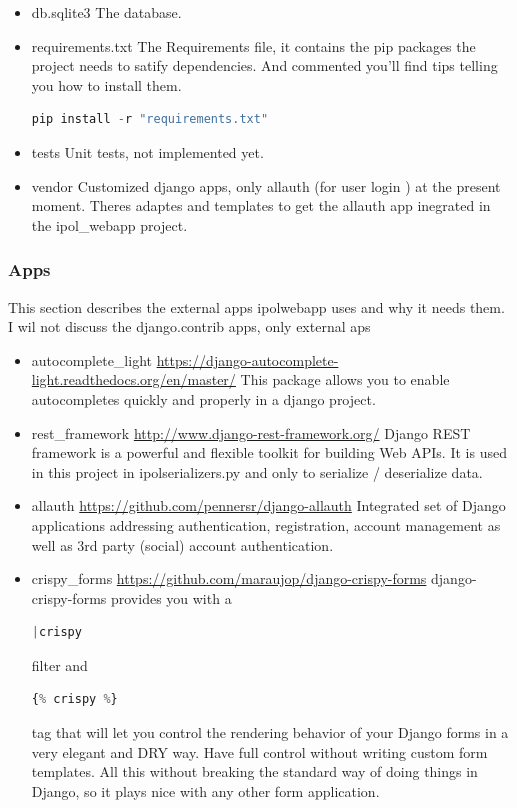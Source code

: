 \begin{itemize}
\item  db.sqlite3
The database.

\item  requirements.txt
The Requirements file, it contains the pip packages the project needs to satify dependencies. And commented you'll find tips telling you how to install them. 
\begin{lstlisting}[language=Python,firstnumber=1]
pip install -r "requirements.txt"
\end{lstlisting}

\item  tests
Unit tests, not implemented yet.

\item  vendor
Customized django apps, only allauth (for user login ) at the present moment. Theres adaptes and templates to get the allauth app inegrated in the ipol\_webapp project.

\end{itemize}


\subsubsection{Apps}
This section describes the external apps ipolwebapp uses and why it needs them. I wil not discuss the django.contrib apps, only external aps

\begin{itemize}

\item  autocomplete\_light
\url{https://django-autocomplete-light.readthedocs.org/en/master/}
This package allows you to enable autocompletes quickly and properly in a django project.

\item  rest\_framework
\url{http://www.django-rest-framework.org/}
Django REST framework is a powerful and flexible toolkit for building Web APIs. It is used in this project in ipolserializers.py and only to serialize / deserialize data.

\item  allauth
\url{https://github.com/pennersr/django-allauth}
Integrated set of Django applications addressing authentication, registration, account management as well as 3rd party (social) account authentication.

\item  crispy\_forms
\url{https://github.com/maraujop/django-crispy-forms}
django-crispy-forms provides you with a 
\begin{lstlisting}[language=Python,firstnumber=1]
|crispy 
\end{lstlisting}
 filter and 
\begin{lstlisting}[language=Python,firstnumber=1]
{% crispy %} 
\end{lstlisting}
tag that will let you control the rendering behavior of your Django forms in a very elegant and DRY way. Have full control without writing custom form templates. All this without breaking the standard way of doing things in Django, so it plays nice with any other form application.

\end{itemize}


